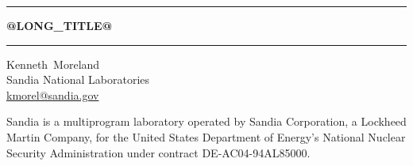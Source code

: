 \documentclass[@GLOBAL_OPTIONS@]{book}
\begin{document}
\frontmatter

\sloppy

\begin{titlepage}


  \noindent\rule{\linewidth}{1.5pt}
  \begin{centering}
    \Huge \bfseries
    @LONG_TITLE@

  \end{centering}
  \noindent\rule{\linewidth}{1.5pt}


  \begin{centering}
    \Large
    Kenneth~Moreland \\
    \small
    Sandia National Laboratories \\
    \href{mailto:kmorel@sandia.gov}{kmorel@sandia.gov} \\
  \end{centering}


  \begin{centering}
    \rmfamily\tiny

    Sandia is a multiprogram laboratory operated by Sandia Corporation, a
    Lockheed Martin Company, for the United States Department of Energy's
    National Nuclear Security Administration under contract
    DE-AC04-94AL85000.

  \end{centering}
\end{titlepage}


\end{document}
